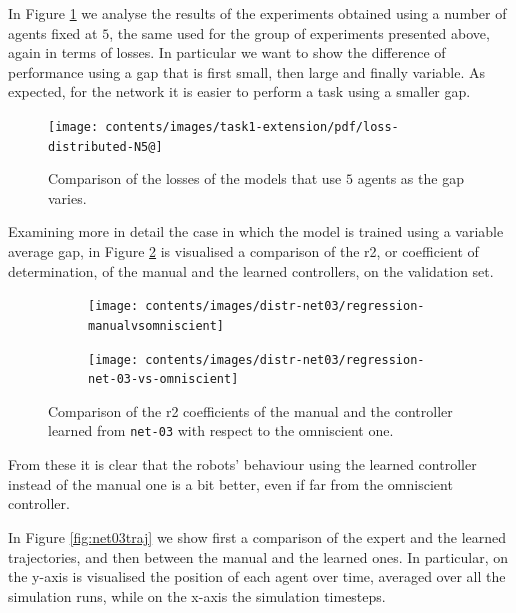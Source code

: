 In Figure \ref{fig:distlossn5} we analyse the results of the experiments 
obtained 
using a number of agents fixed at $5$, the same used for the group of 
experiments presented above, again in terms of losses. In particular we want 
to 
show the difference of performance using a gap that is first small, then large 
and 
finally variable.
As expected, for the network it is easier to perform a task using a smaller 
gap.
\begin{figure}[!htb]
	\centering
	\texttt{[image: contents/images/task1-extension/pdf/loss-distributed-N5@]}%
	\caption{Comparison of the losses of the models that use $5$ agents as 
	the gap 
	varies.}
	\label{fig:distlossn5}
\end{figure}

Examining more in detail the case in which the model is trained using a 
variable 
average gap, in Figure \ref{fig:net03r2} is visualised a comparison of the 
\gls{r2}, 
or coefficient of determination, of the manual and the learned controllers, on 
the 
validation set.
\begin{figure}[!htb]
	\centering
	\begin{subfigure}[h]{0.49\textwidth}
		\centering
		\texttt{[image: contents/images/distr-net03/regression-manualvsomniscient]}%
	\end{subfigure}
	\hfill
	\begin{subfigure}[h]{0.49\textwidth}
		\centering
		\texttt{[image: contents/images/distr-net03/regression-net-03-vs-omniscient]}
	\end{subfigure}
	\caption[Evaluation of the \gls{r2} coefficients of \texttt{net-03} 
	.]{Comparison 
	of the \gls{r2} coefficients of the manual and the controller learned from 
	\texttt{net-03} with respect to the omniscient one.}
	\label{fig:net03r2}
\end{figure}
From these it is clear that the robots' behaviour using the learned controller 
instead of the manual one is a bit better, even if far from the omniscient 
controller.

In Figure \ref{fig:net03traj} we show first a comparison of the expert and the 
learned trajectories, and then between the manual and the learned ones. In 
particular, on the y-axis is visualised the position of each agent over time, 
averaged over all the simulation runs, while on the x-axis the simulation 
timesteps. 

